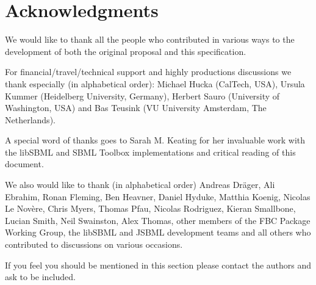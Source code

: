 
\section{Acknowledgments}

We would like to thank all the people who contributed in various ways to the development of both the original proposal and this specification.

For financial/travel/technical support and highly productions discussions we thank especially (in alphabetical order): Michael Hucka (CalTech, USA), Ursula Kummer (Heidelberg University, Germany), Herbert Sauro (University of Washington, USA) and Bas Teusink (VU University Amsterdam, The Netherlands).

A special word of thanks goes to Sarah M. Keating for her invaluable work with the \textsf{libSBML} and \textsf{SBML Toolbox} implementations and critical reading of this document.

We also would like to thank (in alphabetical order) Andreas Dr\"{a}ger, Ali Ebrahim, Ronan Fleming, Ben Heavner, Daniel Hyduke, Matthia Koenig, Nicolas Le Nov\`{e}re, Chris Myers, Thomas Pfau, Nicolas Rodriguez, Kieran Smallbone, Lucian Smith, Neil Swainston, Alex Thomas, other members of the \textsf{FBC Package Working Group}, the libSBML and JSBML development teams and all others who contributed to discussions on various occasions.

If you feel you should be mentioned in this section please contact the authors and ask to be included.

